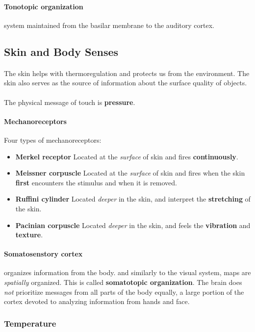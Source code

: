 \documentclass{article}
\begin{document}
	\paragraph{Tonotopic organization} system maintained from the basilar membrane to the auditory cortex.
	\subsection{Skin and Body Senses}
	\paragraph{}The skin helps with thermoregulation and protects us from the environment. The skin also serves as the source of information about the surface quality of objects.
	\paragraph{}The physical message of touch is \textbf{pressure}.
	\paragraph{Mechanoreceptors} Four types of mechanoreceptors:
	\begin{itemize}
		\item \textbf{Merkel receptor} Located at the \emph{surface} of skin and fires \textbf{continuously}.
		\item \textbf{Meissner corpuscle} Located at the \emph{surface} of skin and fires when the skin \textbf{first} encounters the stimulus and when it is removed.
		\item \textbf{Ruffini cylinder} Located \emph{deeper} in the skin, and interpret the \textbf{stretching} of the skin.
		\item \textbf{Pacinian corpuscle} Located \emph{deeper} in the skin, and feels the \textbf{vibration} and \textbf{texture}.
	\end{itemize}
	\paragraph{Somatosenstory cortex} organizes information from the body. and similarly to the visual system, maps are \emph{spatially} organized. This is called \textbf{somatotopic organization}. The brain does \emph{not} prioritize messages from all parts of the body equally, a large portion of the cortex devoted to analyzing information from hands and face.
	\subsubsection{Temperature}
\end{document}
